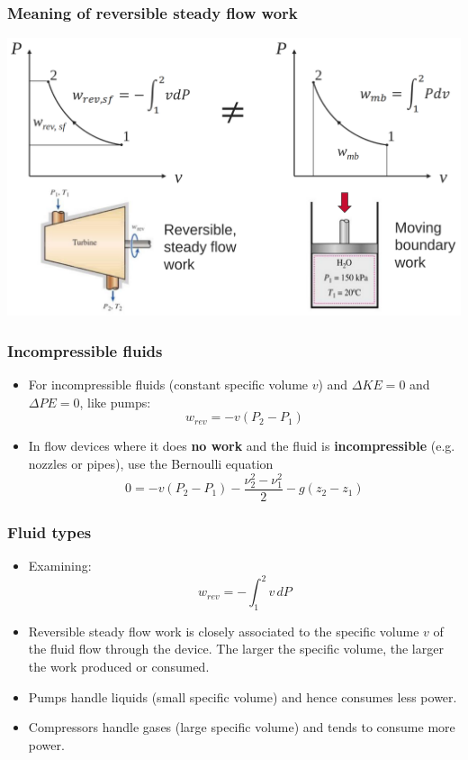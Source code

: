 \documentclass[11pt]{article}
\begin{document}
\subsubsection{Meaning of reversible steady flow work}
\label{sec:org13f9a2b}
\begin{center}
\includegraphics[width=.9\linewidth]{./images/reversible-steady-flow-work.png}
\end{center}
\subsubsection{Incompressible fluids}
\label{sec:org77b6dd7}
\begin{itemize}
\item For incompressible fluids (constant specific volume \(v\)) and \(\Delta KE = 0\) and \(\Delta PE = 0\), like pumps:
\[w_{rev} = -v (P_2 - P_1)\]
\item In flow devices where it does \textbf{no work} and the fluid is \textbf{incompressible} (e.g. nozzles or pipes), use the Bernoulli equation
\[0 = -v (P_2 - P_1) - \frac{\nu_2^2 - \nu_1^2}{2} - g(z_2 - z_1)\]
\end{itemize}
\subsubsection{Fluid types}
\label{sec:org0c3e47c}
\begin{itemize}
\item Examining:
\[w_{rev} = - \int_1^2 v \, dP\]
\item Reversible steady flow work is closely associated to the specific volume \(v\) of the fluid flow through the device. The larger the specific volume, the larger the work produced or consumed.
\item Pumps handle liquids (small specific volume) and hence consumes less power.
\item Compressors handle gases (large specific volume) and tends to consume more power.
\end{itemize}
\end{document}
